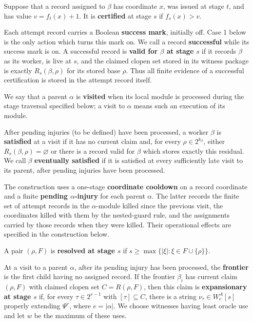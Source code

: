 \documentclass[11pt]{amsart}
\begin{document}
Suppose that a record assigned to $\beta$ has coordinate $x$, was issued at
stage $t$, and has value $v=f_t(x)+1$. It is \textbf{certified} at stage $s$
if $f_s(x)>v$.

Each attempt record carries a Boolean \textbf{success mark}, initially off.
Case 1 below is the only action which turns this mark on. We call a record
\textbf{successful} while its success mark is on. A successful record is
\textbf{valid for $\beta$ at stage $s$} if it records $\beta$ as its worker,
is live at $s$, and the claimed clopen set stored in its witness package is
exactly $R_s(\beta,\rho)$ for its stored base $\rho$.
Thus all finite evidence of a successful certification is stored in the
attempt record itself.

We say that a parent $\alpha$ is \textbf{visited} when its local module is
processed during the stage traversal specified below; a visit to $\alpha$
means such an execution of its module.

After pending injuries (to be defined) have been processed, a worker $\beta$ is
\textbf{satisfied} at a visit if it has no current claim and, for every
$\rho\in2^{k_\beta}$, either $R_s(\beta,\rho)=\varnothing$ or there is a
record valid for $\beta$ which stores exactly this residual. We call $\beta$
\textbf{eventually satisfied} if it is satisfied at every sufficiently late
visit to its parent, after pending injuries have been processed.

The construction uses a one-stage \textbf{coordinate cooldown} on a record
coordinate and a finite \textbf{pending $\alpha$-injury} for each parent
$\alpha$. The latter records
the finite set of attempt records in the $\alpha$-module killed since the
previous visit, the coordinates killed with them by the nested-guard rule,
and the assignments carried by those records when they were killed. Their
operational effects are specified in the construction below. 

A pair $(\rho,F)$ is
\textbf{resolved at stage $s$} if
$s\geq\max\{|\xi|:\xi\in F\cup\{\rho\}\}$.

At a visit to a parent $\alpha$, after its pending injury has been processed,
the \textbf{frontier} is the first child having no assigned record. If the
frontier $\beta_i$ has current claim $(\rho,F)$ with claimed clopen set
$C=R(\rho,F)$, then this claim is \textbf{expansionary at stage $s$} if, for
every $\tau\in2^{s-1}$ with $[\tau]\subseteq C$, there is a string $\nu_\tau\in W_e^A[s]$ properly extending $\Psi^\tau$, where $e=|\alpha|$.
We choose witnesses having least oracle use and let $w$ be the maximum of
these uses.
\end{document}
